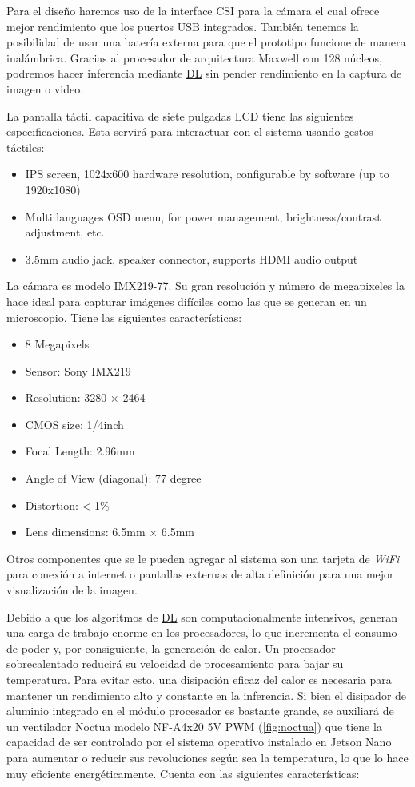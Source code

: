 Para el diseño haremos uso de la interface CSI para la cámara el cual ofrece
mejor rendimiento que los puertos USB integrados. También tenemos la posibilidad
de usar una batería externa para que el prototipo funcione de manera
inalámbrica. Gracias al procesador de arquitectura Maxwell con 128 núcleos,
podremos hacer inferencia mediante \hyperlink{abbr}{DL} sin pender rendimiento
en la captura de imagen o video.

La pantalla táctil capacitiva de siete pulgadas LCD tiene las siguientes
especificaciones. Esta servirá para interactuar con el sistema usando gestos
táctiles:

\begin{itemize}
    \item IPS screen, 1024x600 hardware resolution, configurable by software (up
    to 1920x1080)
    \item Multi languages OSD menu, for power management, brightness/contrast adjustment, etc. 
    \item 3.5mm audio jack, speaker connector, supports HDMI audio output
\end{itemize}

La cámara es modelo IMX219-77. Su gran resolución y número de megapixeles la
hace ideal para capturar imágenes difíciles como las que se generan en un
microscopio. Tiene las siguientes características:

\begin{itemize}
    \item 8 Megapixels
    \item Sensor: Sony IMX219
    \item Resolution: 3280 × 2464
    \item CMOS size: 1/4inch
    \item Focal Length: 2.96mm
    \item Angle of View (diagonal): 77 degree
    \item Distortion: < 1\%
    \item Lens dimensions: 6.5mm × 6.5mm
\end{itemize}

Otros componentes que se le pueden agregar al sistema son una tarjeta de
\emph{WiFi} para conexión a internet o pantallas externas de alta definición
para una mejor visualización de la imagen.

Debido a que los algoritmos de \hyperlink{abbr}{DL} son computacionalmente
intensivos, generan una carga de trabajo enorme en los procesadores, lo que
incrementa el consumo de poder y, por consiguiente, la generación de calor. Un
procesador sobrecalentado reducirá su velocidad de procesamiento para bajar su
temperatura. Para evitar esto, una disipación eficaz del calor es necesaria para
mantener un rendimiento alto y constante en la inferencia. Si bien el disipador
de aluminio integrado en el módulo procesador es bastante grande, se auxiliará
de un ventilador Noctua modelo NF-A4x20 5V PWM (\autoref{fig:noctua}) que tiene
la capacidad de ser controlado por el sistema operativo instalado en Jetson Nano
para aumentar o reducir sus revoluciones según sea la temperatura, lo que lo
hace muy eficiente energéticamente. Cuenta con las siguientes características:

